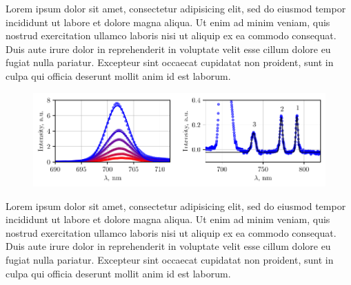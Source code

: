 Lorem ipsum dolor sit amet, consectetur adipisicing elit, sed do eiusmod
tempor incididunt ut labore et dolore magna aliqua. Ut enim ad minim veniam,
quis nostrud exercitation ullamco laboris nisi ut aliquip ex ea commodo
consequat. Duis aute irure dolor in reprehenderit in voluptate velit esse
cillum dolore eu fugiat nulla pariatur. Excepteur sint occaecat cupidatat non
proident, sunt in culpa qui officia deserunt mollit anim id est laborum.

\begin{figure}[h]
    \centering
    \includegraphics{../labs/2/T_dep.pdf}
\end{figure}


Lorem ipsum dolor sit amet, consectetur adipisicing elit, sed do eiusmod
tempor incididunt ut labore et dolore magna aliqua. Ut enim ad minim veniam,
quis nostrud exercitation ullamco laboris nisi ut aliquip ex ea commodo
consequat. Duis aute irure dolor in reprehenderit in voluptate velit esse
cillum dolore eu fugiat nulla pariatur. Excepteur sint occaecat cupidatat non
proident, sunt in culpa qui officia deserunt mollit anim id est laborum.